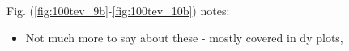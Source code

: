 	Fig. (\ref{fig:100tev_9b}-\ref{fig:100tev_10b}) notes:

	\begin{itemize}
		\item Not much more to say about these - mostly covered in dy plots,
	\end{itemize}

